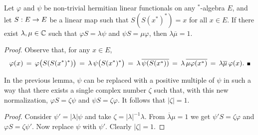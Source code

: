 \begin{lemma_sec}
Let\/ $\varphi$ and\/ $\psi$ be non-trivial hermitian linear functionals on any
$^*$-algebra\/ $E$, and let\/ $S: E \rightarrow E$ be a linear map such that\/ $S(S(x^*)^*)=x$
for all\/ $x\in E$. If there exist\/ $\lambda, \mu \in \mathbb{C}$ such that\/
$\varphi S = \lambda \psi$ and\/ $\psi S = \mu \varphi$, then\/ $\lambda \overline{\mu}=1$.
\end{lemma_sec}
{\em Proof}\@.
Observe that, for any $x\in E$,
$$ \varphi(x) \,=\, \varphi \!\left(S(S(x^*)^*)\vertM\right)
              \,=\, \lambda\, \psi\! \left(S(x^*)^*\vertM\right)
              \,=\, \lambda\, \overline{\psi(S(x^*))}
              \,=\, \lambda\, \overline{\mu \varphi(x^*)}
              \,=\, \lambda \overline{\mu}\, \varphi(x). \:\: \qed $$


\begin{cor_sec} \label{cor:scaling}
In the previous lemma, $\psi$ can be replaced with a positive multiple of\/ $\psi$
in such a way that there exists a single complex number\/ $\zeta$ such that,
with this new normalization, $\varphi S = \zeta \psi$ and\/ $\psi S = \zeta \varphi$.
It follows that\/ $|\zeta|=1$.
\end{cor_sec}
\begin{proof}
Consider $\psi'=|\lambda|\psi$ and take $\zeta= |\lambda|^{-1} \lambda$.
From $\overline{\lambda}\mu=1$ we get $\psi' S = \zeta \varphi$
and $\varphi S = \zeta \psi'$. Now replace $\psi$ with $\psi'$.
Clearly $|\zeta|=1$. %
\end{proof}
